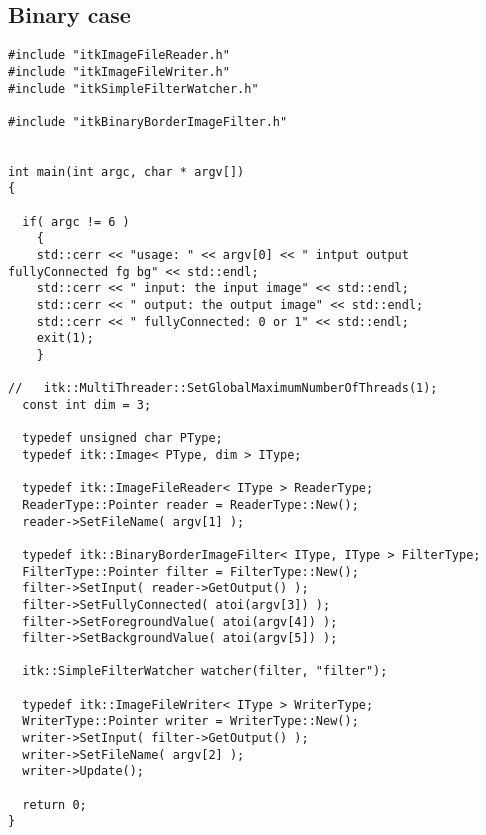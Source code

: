 \documentclass{InsightArticle}
\begin{document}
\subsection{Binary case}

\small \begin{verbatim}
#include "itkImageFileReader.h"
#include "itkImageFileWriter.h"
#include "itkSimpleFilterWatcher.h"

#include "itkBinaryBorderImageFilter.h"


int main(int argc, char * argv[])
{

  if( argc != 6 )
    {
    std::cerr << "usage: " << argv[0] << " intput output fullyConnected fg bg" << std::endl;
    std::cerr << " input: the input image" << std::endl;
    std::cerr << " output: the output image" << std::endl;
    std::cerr << " fullyConnected: 0 or 1" << std::endl;
    exit(1);
    }

//   itk::MultiThreader::SetGlobalMaximumNumberOfThreads(1);
  const int dim = 3;
  
  typedef unsigned char PType;
  typedef itk::Image< PType, dim > IType;

  typedef itk::ImageFileReader< IType > ReaderType;
  ReaderType::Pointer reader = ReaderType::New();
  reader->SetFileName( argv[1] );

  typedef itk::BinaryBorderImageFilter< IType, IType > FilterType;
  FilterType::Pointer filter = FilterType::New();
  filter->SetInput( reader->GetOutput() );
  filter->SetFullyConnected( atoi(argv[3]) );
  filter->SetForegroundValue( atoi(argv[4]) );
  filter->SetBackgroundValue( atoi(argv[5]) );

  itk::SimpleFilterWatcher watcher(filter, "filter");

  typedef itk::ImageFileWriter< IType > WriterType;
  WriterType::Pointer writer = WriterType::New();
  writer->SetInput( filter->GetOutput() );
  writer->SetFileName( argv[2] );
  writer->Update();

  return 0;
}
\end{verbatim} \normalsize
\end{document}
